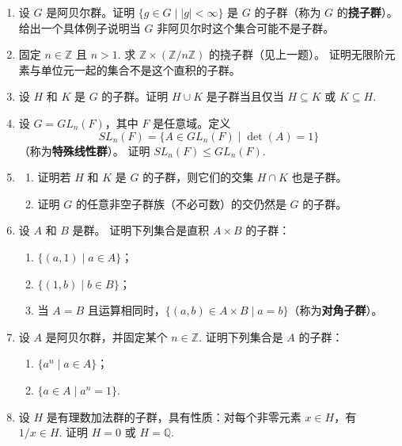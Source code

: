 \begin{enumerate}
\item 设 \( G \) 是阿贝尔群。证明 \( \{ g \in G \mid |g| < \infty \} \) 是 \( G \) 的子群（称为 \( G \) 的\textbf{挠子群}）。
给出一个具体例子说明当 \( G \) 非阿贝尔时这个集合可能不是子群。

\item 固定 \( n \in \mathbb{Z} \) 且 \( n > 1 \). 求 \( \mathbb{Z} \times (\mathbb{Z}/n\mathbb{Z}) \) 的挠子群（见上一题）。
证明无限阶元素与单位元一起的集合不是这个直积的子群。

\item 设 \( H \) 和 \( K \) 是 \( G \) 的子群。证明 \( H \cup K \) 是子群当且仅当 \( H \subseteq K \) 或 \( K \subseteq H \).

\item 设 \( G = GL_n(F) \)，其中 \( F \) 是任意域。定义
\[
SL_n(F) = \{ A \in GL_n(F) \mid \det(A) = 1 \}
\]
（称为\textbf{特殊线性群}）。
证明 \( SL_n(F) \leq GL_n(F) \).

\item \begin{enumerate}[label=(\alph*)]
\item 证明若 \( H \) 和 \( K \) 是 \( G \) 的子群，则它们的交集 \( H \cap K \) 也是子群。
\item 证明 \( G \) 的任意非空子群族（不必可数）的交仍然是 \( G \) 的子群。
\end{enumerate}

\item 设 \( A \) 和 \( B \) 是群。
证明下列集合是直积 \( A \times B \) 的子群：
\begin{enumerate}[label=(\alph*)]
\item \( \{ (a, 1) \mid a \in A \} \)；
\item \( \{ (1, b) \mid b \in B \} \)；
\item 当 \( A = B \) 且运算相同时，\( \{ (a, b) \in A \times B \mid a = b \} \)（称为\textbf{对角子群}）。
\end{enumerate}

\item 设 \( A \) 是阿贝尔群，并固定某个 \( n \in \mathbb{Z} \). 
证明下列集合是 \( A \) 的子群：
\begin{enumerate}[label=(\alph*)]
\item \( \{a^n \mid a \in A\} \)；
\item \( \{a \in A \mid a^n = 1\} \).
\end{enumerate}

\item 设 \( H \) 是有理数加法群的子群，具有性质：对每个非零元素 \( x \in H \)，有 \( 1/x \in H \). 证明 \( H = 0 \) 或 \( H = \mathbb{Q} \).


\end{enumerate}
